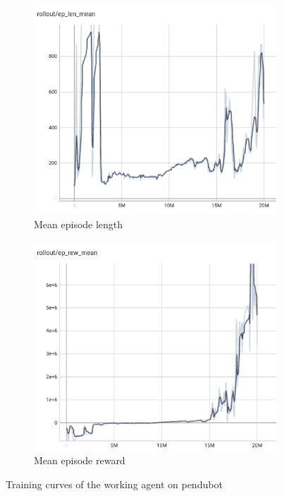 \begin{figure}[H]
    \centering
    \begin{subfigure}[b]{0.47\textwidth}
        \centering
        \includegraphics[width=\textwidth]{figures/hardware_result/train_without_limit_ep_length.png}
        \caption{Mean episode length}
        \label{fig:mean episode length}
    \end{subfigure}
    \hfill %
    \begin{subfigure}[b]{0.47\textwidth}
        \centering
        \includegraphics[width=\textwidth]{figures/hardware_result/train_without_limit_ep_reward.png}
        \caption{Mean episode reward}
        \label{fig:mean episode reward}
    \end{subfigure}
    \caption{Training curves of the working agent on pendubot}
    \label{fig:training_curves_for_real_world}
\end{figure}

